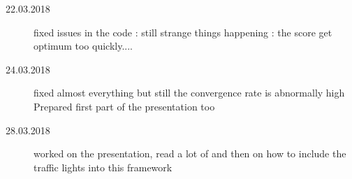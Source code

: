 \documentclass[14pt,a4paper]{article}
\theoremstyle{definition}
\begin{document}
\begin{description}
\item[22.03.2018] fixed issues in the code : still strange things happening : the score get optimum too quickly....

\item[24.03.2018] fixed almost everything but still the convergence rate is abnormally high \\ Prepared first part of the presentation too 

\item[28.03.2018] worked on the presentation, read a lot of \citep{Xia2015} and then on how to include the traffic lights into this framework

\end{description}


\newpage



\end{document}
